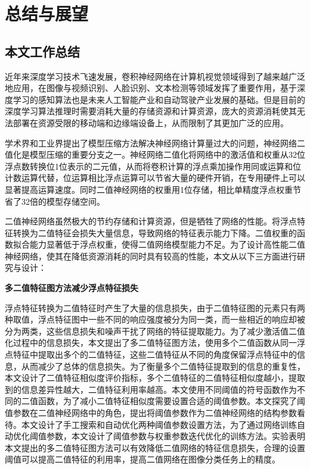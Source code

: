 
\chapter{总结与展望}

\section{本文工作总结}

近年来深度学习技术飞速发展，卷积神经网络在计算机视觉领域得到了越来越广泛地应用，在图像与视频识别、人脸识别、文本检测等领域发挥了重要作用，基于深度学习的感知算法也是未来人工智能产业和自动驾驶产业发展的基础。但是目前的深度学习算法推理时需要消耗大量的存储资源和计算资源，庞大的资源消耗使其无法部署在资源受限的移动端和边缘端设备上，从而限制了其更加广泛的应用。

学术界和工业界提出了模型压缩方法解决神经网络计算量过大的问题，神经网络二值化是模型压缩的重要分支之一。神经网络二值化将网络中的激活值和权重从32位浮点数转换位1位表示的二元值，从而将卷积计算的浮点乘加操作用同或运算和位计数运算代替，位运算相比浮点运算可以节省大量的硬件开销，在专用硬件上可以显著提高运算速度。同时二值神经网络的权重用1位存储，相比单精度浮点权重节省了32倍的模型存储空间。

二值神经网络虽然极大的节约存储和计算资源，但是牺牲了网络的性能。将浮点特征转换为二值特征会损失大量信息，导致网络的特征表示能力下降。二值权重的函数拟合能力显著低于浮点权重，使得二值网络模型能力不足。为了设计高性能二值神经网络，使其在降低资源消耗的同时具有较高的性能，本文从以下三方面进行研究与设计：

\textbf{多二值特征图方法减少浮点特征损失}

浮点特征转换为二值特征时产生了大量的信息损失，由于二值特征图的元素只有两种取值，浮点特征图中一些不同的响应强度被分为同一类，而一些相近的响应却被分为两类，这些信息损失和噪声干扰了网络的特征提取能力。为了减少激活值二值化过程中的信息损失，本文提出了多二值特征图方法，使用多个二值函数从同一浮点特征中提取出多个的二值特征，这些二值特征从不同的角度保留浮点特征中的信息，从而减少了总体的信息损失。为了衡量多个二值特征提取到的信息的重复性，本文设计了二值特征相似度评价指标，多个二值特征的二值特征相似度越小，提取到的信息差异性越大，二值特征利用率越高。本文使用不同阈值的符号函数作为不同的二值函数，为了减小二值特征相似度需要设置合适的阈值参数。本文探究了阈值参数在二值神经网络中的角色，提出将阈值参数作为二值神经网络的结构参数看待。本文设计了手工搜索和自动优化两种阈值参数设置方法，为了通过网络训练自动优化阈值参数，本文设计了阈值参数与权重参数迭代优化的训练方法。实验表明本文提出的多二值特征图方法可以有效降低二值网络的特征信息损失，合理的设置阈值可以提高二值特征的利用率，提高二值网络在图像分类任务上的精度。

